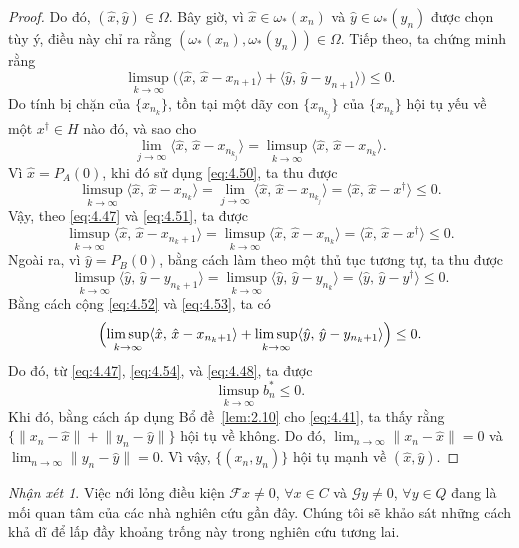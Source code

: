 \documentclass[11pt,a4paper]{article}
\theoremstyle{plain}
\theoremstyle{definition}
\theoremstyle{remark}
\newtheorem{remark}[theorem]{Nhận xét}
\numberwithin{equation}{section}
\newcommand{\Fc}{\mathcal{F}}
\newcommand{\Gc}{\mathcal{G}}
\newcommand{\inp}[2]{\langle #1,\,#2\rangle}
\newcommand{\nm}[1]{\lVert #1\rVert}
\begin{document}
\begin{proof}
Do đó, $(\hat{x},\hat{y})\in\Omega$. Bây giờ, vì $\hat{x}\in\omega_{*}(x_n)$ và $\hat{y}\in\omega_{*}(y_n)$ được chọn tùy ý, điều này chỉ ra rằng $(\omega_{*}(x_n),\omega_{*}(y_n))\in\Omega$. Tiếp theo, ta chứng minh rằng
\[
\limsup_{k\to\infty}\bigl(\inp{\hat{x}}{\hat{x}-x_{n+1}}+\inp{\hat{y}}{\hat{y}-y_{n+1}}\bigr)\le 0.
\]
Do tính bị chặn của $\{x_{n_k}\}$, tồn tại một dãy con $\{x_{n_{k_j}}\}$ của $\{x_{n_k}\}$ hội tụ yếu về một $x^{\dagger}\in H$ nào đó, và sao cho
\begin{equation}
\lim_{j\to\infty}\inp{\hat{x}}{\hat{x}-x_{n_{k_j}}}=\limsup_{k\to\infty}\inp{\hat{x}}{\hat{x}-x_{n_k}}. \label{eq:4.50}
\end{equation}
Vì $\hat{x}=P_A(0)$, khi đó sử dụng \eqref{eq:4.50}, ta thu được
\begin{equation}
\limsup_{k\to\infty}\inp{\hat{x}}{\hat{x}-x_{n_k}}=\lim_{j\to\infty}\inp{\hat{x}}{\hat{x}-x_{n_{k_j}}}=\inp{\hat{x}}{\hat{x}-x^{\dagger}}\le 0. \label{eq:4.51}
\end{equation}
Vậy, theo \eqref{eq:4.47} và \eqref{eq:4.51}, ta được
\begin{equation}
\limsup_{k\to\infty}\inp{\hat{x}}{\hat{x}-x_{n_k+1}}=\limsup_{k\to\infty}\inp{\hat{x}}{\hat{x}-x_{n_k}}=\inp{\hat{x}}{\hat{x}-x^{\dagger}}\le 0. \label{eq:4.52}
\end{equation}
Ngoài ra, vì $\hat{y}=P_B(0)$, bằng cách làm theo một thủ tục tương tự, ta thu được
\begin{equation}
\limsup_{k\to\infty}\inp{\hat{y}}{\hat{y}-y_{n_k+1}}=\limsup_{k\to\infty}\inp{\hat{y}}{\hat{y}-y_{n_k}}=\inp{\hat{y}}{\hat{y}-y^{\dagger}}\le 0. \label{eq:4.53}
\end{equation}
Bằng cách cộng \eqref{eq:4.52} và \eqref{eq:4.53}, ta có
\begin{equation}
\Bigl(\limsup_{k\to\infty}\inp{\hat{x}}{\hat{x}-x_{n_k+1}}+\limsup_{k\to\infty}\inp{\hat{y}}{\hat{y}-y_{n_k+1}}\Bigr)\le 0. \label{eq:4.54}
\end{equation}
Do đó, từ \eqref{eq:4.47}, \eqref{eq:4.54}, và \eqref{eq:4.48}, ta được
\[
\limsup_{k\to\infty}b_n^{*}\le 0.
\]
Khi đó, bằng cách áp dụng Bổ đề~\ref{lem:2.10} cho \eqref{eq:4.41}, ta thấy rằng $\{\nm{x_n-\hat{x}}+\nm{y_n-\hat{y}}\}$ hội tụ về không. Do đó, $\lim_{n\to\infty}\nm{x_n-\hat{x}}=0$ và $\lim_{n\to\infty}\nm{y_n-\hat{y}}=0$. Vì vậy, $\{(x_n,y_n)\}$ hội tụ mạnh về $(\hat{x},\hat{y})$.
\end{proof}

\begin{remark}
Việc nới lỏng điều kiện $\Fc x\ne 0$, $\forall x\in C$ và $\Gc y\ne 0$, $\forall y\in Q$ đang là mối quan tâm của các nhà nghiên cứu gần đây. Chúng tôi sẽ khảo sát những cách khả dĩ để lấp đầy khoảng trống này trong nghiên cứu tương lai.
\end{remark}
\end{document}
